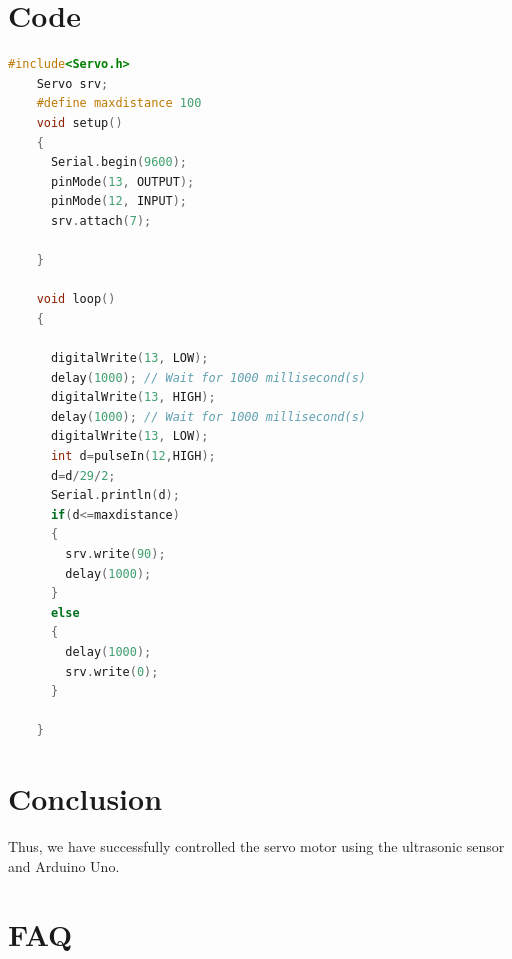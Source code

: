 \documentclass[11pt]{article}
\begin{document}
\section{Code}
\begin{lstlisting}[language=C++]
	#include<Servo.h>
	Servo srv;
	#define maxdistance 100
	void setup()
	{
	  Serial.begin(9600);
	  pinMode(13, OUTPUT);
	  pinMode(12, INPUT);
	  srv.attach(7);
	
	}
	
	void loop()
	{
	 
	  digitalWrite(13, LOW);
	  delay(1000); // Wait for 1000 millisecond(s)
	  digitalWrite(13, HIGH);
	  delay(1000); // Wait for 1000 millisecond(s)
	  digitalWrite(13, LOW);
	  int d=pulseIn(12,HIGH);
	  d=d/29/2;
	  Serial.println(d);
	  if(d<=maxdistance)
	  {
		srv.write(90);
		delay(1000);
	  }
	  else
	  {
		delay(1000);
		srv.write(0);
	  }
		
	}
\end{lstlisting}
\section{Conclusion}
Thus, we have successfully controlled the servo motor using the ultrasonic sensor and Arduino Uno.
\clearpage

\section{FAQ}
\end{document}
